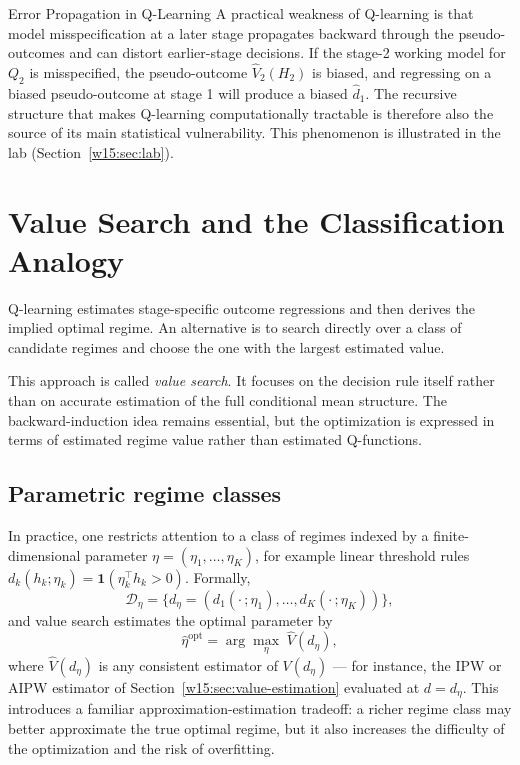 \documentclass[master.tex]{subfiles}
\begin{document}
\begin{warn}{Error Propagation in Q-Learning}
A practical weakness of Q-learning is that model misspecification at a later stage propagates backward through the pseudo-outcomes and can distort earlier-stage decisions. If the stage-2 working model for $Q_2$ is misspecified, the pseudo-outcome $\widehat{V}_2(H_2)$ is biased, and regressing on a biased pseudo-outcome at stage 1 will produce a biased $\hat{d}_1$. The recursive structure that makes Q-learning computationally tractable is therefore also the source of its main statistical vulnerability. This phenomenon is illustrated in the lab (Section~\ref{w15:sec:lab}).
\end{warn}

\section{Value Search and the Classification Analogy}
\label{w15:sec:valuesearch}

Q-learning estimates stage-specific outcome regressions and then derives the implied optimal regime. An alternative is to search directly over a class of candidate regimes and choose the one with the largest estimated value.

This approach is called \emph{value search}. It focuses on the decision rule itself rather than on accurate estimation of the full conditional mean structure. The backward-induction idea remains essential, but the optimization is expressed in terms of estimated regime value rather than estimated Q-functions.

\subsection{Parametric regime classes}

In practice, one restricts attention to a class of regimes indexed by a finite-dimensional parameter $\eta = (\eta_1,\ldots,\eta_K)$, for example linear threshold rules $d_k(h_k;\eta_k) = \mathbf{1}(\eta_k^\top h_k > 0)$. Formally,
\[
\mathcal{D}_\eta = \bigl\{d_\eta = (d_1(\cdot\,;\eta_1),\ldots,d_K(\cdot\,;\eta_K))\bigr\},
\]
and value search estimates the optimal parameter by
\[
\hat\eta^{\mathrm{opt}} = \arg\max_{\eta}\; \widehat{V}(d_\eta),
\]
where $\widehat{V}(d_\eta)$ is any consistent estimator of $V(d_\eta)$ --- for instance, the IPW or AIPW estimator of Section~\ref{w15:sec:value-estimation} evaluated at $d = d_\eta$. This introduces a familiar approximation-estimation tradeoff: a richer regime class may better approximate the true optimal regime, but it also increases the difficulty of the optimization and the risk of overfitting.
\end{document}
